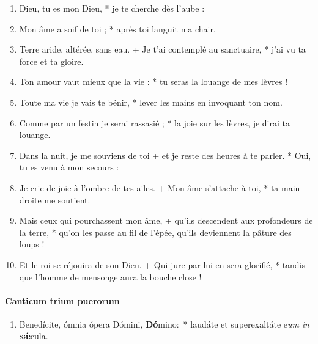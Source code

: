 \documentclass[twoside]{article}
\begin{document}
\begin{paracol}[1]{2}
\begin{enumerate}[wide, itemsep=0mm, labelwidth=!, labelindent=0pt, label=\color{gregoriocolor}\theenumi]

\item Dieu, tu es mon Dieu, *
je te cherche dès l’aube :
   
\item Mon âme a soif de toi ; *
après toi languit ma chair,

\item Terre aride, altérée, sans eau. +
Je t’ai contemplé au sanctuaire, *
j’ai vu ta force et ta gloire.

\item Ton amour vaut mieux que la vie : *
tu seras la louange de mes lèvres !

\item Toute ma vie je vais te bénir, *
lever les mains en invoquant ton nom.

\item Comme par un festin je serai rassasié ; *
la joie sur les lèvres, je dirai ta louange.

\item Dans la nuit, je me souviens de toi +
et je reste des heures à te parler. *
Oui, tu es venu à mon secours :

\item Je crie de joie à l’ombre de tes ailes. +
Mon âme s’attache à toi, *
ta main droite me soutient.

\item Mais ceux qui pourchassent mon âme, +
qu'ils descendent aux profondeurs de la terre, *
qu'on les passe au fil de l'épée, qu'ils deviennent la pâture des loups !

\item Et le roi se réjouira de son Dieu. +
Qui jure par lui en sera glorifié, *
tandis que l'homme de mensonge aura la bouche close !


\end{enumerate}

\switchcolumn*
\paragraph{Canticum trium puerorum}



\begin{enumerate}[wide, itemsep=0mm, labelwidth=!, labelindent=0pt, label=\color{gregoriocolor}\theenumi]
\item Benedícite, ómnia ópera Dómini, \textbf{Dó}mino:~* laudáte et superexaltáte e\textit{um} \textit{in} \textbf{sǽ}cula.


\end{enumerate}
\end{paracol}
\end{document}
